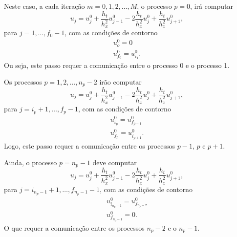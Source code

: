 Neste caso, a cada iteração $m=0,1,2,\ldots, M$, o processo $p=0$, irá computar
\begin{equation}
  u_j = u^0_j + \frac{h_t}{h_x^2}u^0_{j-1} - 2\frac{h_t}{h_x^2}u^0_{j} + \frac{h_t}{h_x^2}u^0_{j+1},
\end{equation}
para $j=1,\dotsc,f_0-1$, com as condições de contorno
\begin{gather}
  u^0_o = 0\\
  u^0_{f_0} = u^0_{i_1}.
\end{gather}
Ou seja, este passo requer a comunicação entre o processo 0 e o processo 1.

Os processos $p=1,2,\dotsc,n_p-2$ irão computar
\begin{equation}
  u_j = u^0_j + \frac{h_t}{h_x^2}u^0_{j-1} - 2\frac{h_t}{h_x^2}u^0_{j} + \frac{h_t}{h_x^2}u^0_{j+1},
\end{equation}
para $j=i_p+1,\dotsc, f_p-1$, com as condições de contorno
\begin{gather}
  u^0_{i_p} = u^0_{f_{p-1}}\\
  u^0_{f_p} = u^0_{i_{p+1}}.
\end{gather}
Logo, este passo requer a comunicação entre os processos $p-1$, $p$ e $p+1$.

Ainda, o processo $p=n_p-1$ deve computar
\begin{equation}
  u_j = u^0_j + \frac{h_t}{h_x^2}u^0_{j-1} - 2\frac{h_t}{h_x^2}u^0_{j} + \frac{h_t}{h_x^2}u^0_{j+1},
\end{equation}
para $j=i_{n_p-1}+1,\dotsc, f_{n_p-1}-1$, com as condições de contorno
\begin{gather}
  u^0_{i_{n_p-1}} = u^0_{f_{n_p-2}}\\
  u^0_{f_{n_p-1}} = 0.
\end{gather}
O que requer a comunicação entre os processos $n_p-2$ e o $n_p-1$.


